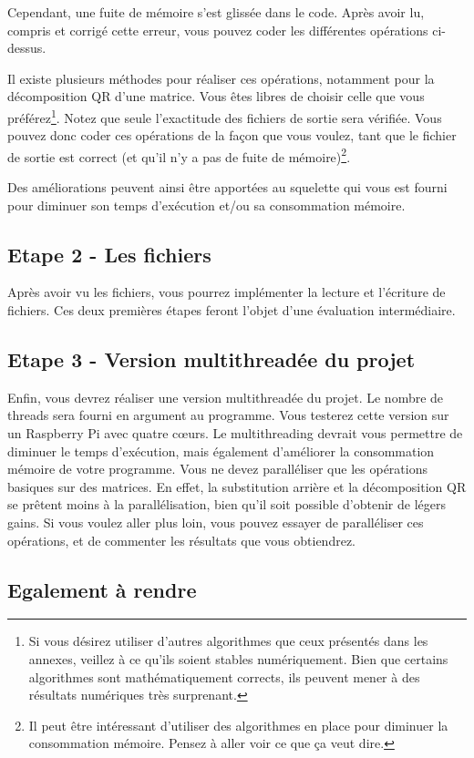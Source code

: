 \documentclass[a4paper, 12pt]{article}
\begin{document}
Cependant, une fuite de mémoire s'est glissée dans le code. Après avoir lu, compris et corrigé cette erreur, vous pouvez coder les différentes opérations ci-dessus. 

Il existe plusieurs méthodes pour réaliser ces opérations, notamment pour la décomposition QR d'une matrice. Vous êtes libres de choisir celle que vous préférez\footnote{Si vous désirez utiliser d'autres algorithmes que ceux présentés dans les annexes, veillez à ce qu'ils soient stables numériquement. Bien que certains algorithmes sont mathématiquement corrects, ils peuvent mener à des résultats numériques très surprenant.}. Notez que seule l'exactitude des fichiers de sortie sera vérifiée. Vous pouvez donc coder ces opérations de la façon que vous voulez, tant que le fichier de sortie est correct (et qu'il n'y a pas de fuite de mémoire)\footnote{Il peut être intéressant d'utiliser des algorithmes en place pour diminuer la consommation mémoire. Pensez à aller voir ce que ça veut dire.}. 

Des améliorations peuvent ainsi être apportées au squelette qui vous est fourni pour diminuer son temps d'exécution et/ou sa consommation mémoire.

\subsection*{Etape 2 - Les fichiers}
Après avoir vu les fichiers, vous pourrez implémenter la lecture et l'écriture de fichiers. Ces deux premières étapes feront l'objet d'une évaluation intermédiaire.

\subsection*{Etape 3 - Version multithreadée du projet}
Enfin, vous devrez réaliser une version multithreadée du projet. Le nombre de threads sera fourni en argument au programme. Vous testerez cette version sur un Raspberry Pi avec quatre cœurs. Le multithreading devrait vous permettre de diminuer le temps d'exécution, mais également d'améliorer la consommation mémoire de votre programme. Vous ne devez paralléliser que les opérations basiques sur des matrices. En effet, la substitution arrière et la décomposition QR se prêtent moins à la parallélisation, bien qu'il soit possible d'obtenir de légers gains. Si vous voulez aller plus loin, vous pouvez essayer de paralléliser ces opérations, et de commenter les résultats que vous obtiendrez.
\subsection*{Egalement à rendre}
\end{document}
